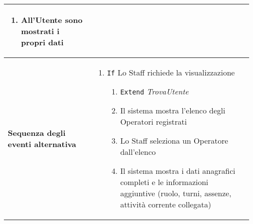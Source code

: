 \documentclass[a4paper]{report}
\begin{document}
\begin{table}[H]
\begin{tabular}{|p{3.9cm}|p{9.9cm}|}
\begin{enumerate}[leftmargin=14pt,label=\arabic*.,labelsep=0.5em,topsep=0pt,partopsep=0pt,parsep=0pt,itemsep=0pt]
    \item All’Utente sono mostrati i propri dati
    \end{enumerate} \\ \hline
\textbf{Sequenza degli eventi alternativa} & \begin{enumerate}[leftmargin=14pt,label=\arabic*.,labelsep=0.5em,topsep=0pt,partopsep=0pt,parsep=0pt,itemsep=0pt] 
    \item \texttt{If} Lo Staff richiede la visualizzazione
    \begin{enumerate}[label=\arabic{enumi}.\arabic*.,leftmargin=22pt,labelsep=0.5em,topsep=0pt,partopsep=0pt,parsep=0pt,itemsep=0pt]
        \item \texttt{Extend} \textit{TrovaUtente} 
        \item Il sistema mostra l’elenco degli Operatori registrati
        \item Lo Staff seleziona un Operatore dall’elenco
        \item Il sistema mostra i dati anagrafici completi e le informazioni aggiuntive (ruolo, turni, assenze, attività corrente collegata)
    \end{enumerate}
\end{enumerate}\\ \hline
\end{tabular}
\end{table}
\end{document}
